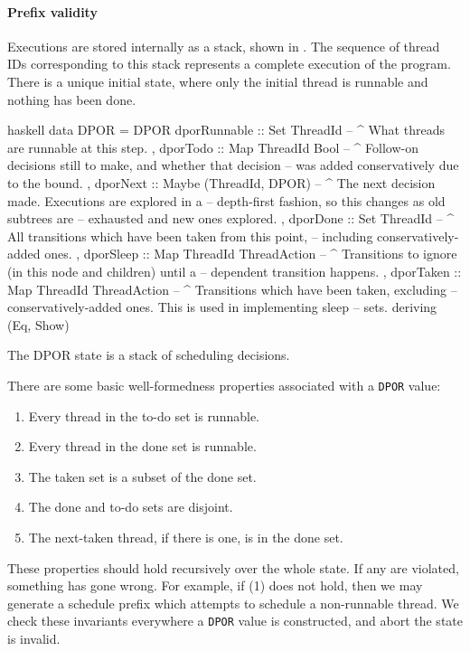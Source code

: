 \paragraph{Prefix validity}
Executions are stored internally as a stack, shown in .
The sequence of thread IDs corresponding to this stack represents a
complete execution of the program.  There is a unique initial state,
where only the initial thread is runnable and nothing has been done.

\begin{listing}
\centering
\begin{cminted}{haskell}
data DPOR = DPOR
  { dporRunnable :: Set ThreadId
  -- ^ What threads are runnable at this step.
  , dporTodo     :: Map ThreadId Bool
  -- ^ Follow-on decisions still to make, and whether that decision
  -- was added conservatively due to the bound.
  , dporNext     :: Maybe (ThreadId, DPOR)
  -- ^ The next decision made. Executions are explored in a
  -- depth-first fashion, so this changes as old subtrees are
  -- exhausted and new ones explored.
  , dporDone     :: Set ThreadId
  -- ^ All transitions which have been taken from this point,
  -- including conservatively-added ones.
  , dporSleep    :: Map ThreadId ThreadAction
  -- ^ Transitions to ignore (in this node and children) until a
  -- dependent transition happens.
  , dporTaken    :: Map ThreadId ThreadAction
  -- ^ Transitions which have been taken, excluding
  -- conservatively-added ones. This is used in implementing sleep
  -- sets.
  } deriving (Eq, Show)
\end{cminted}
\caption{The DPOR state is a stack of scheduling decisions.}\label{lst:dpor}
\end{listing}

There are some basic well-formedness properties associated with a
\verb|DPOR| value:

\begin{enumerate}
\item Every thread in the to-do set is runnable.
\item Every thread in the done set is runnable.
\item The taken set is a subset of the done set.
\item The done and to-do sets are disjoint.
\item The next-taken thread, if there is one, is in the done set.
\end{enumerate}

These properties should hold recursively over the whole state.  If any
are violated, something has gone wrong.  For example, if (1) does not
hold, then we may generate a schedule prefix which attempts to
schedule a non-runnable thread.  We check these invariants everywhere
a \verb|DPOR| value is constructed, and abort the state is invalid.

